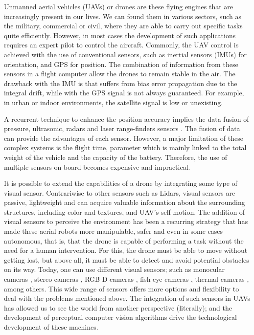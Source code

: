 Unmanned aerial vehicles (UAVs) or drones are these flying engines that are increasingly present in our lives. We can found them in various sectors, such as the military, commercial or civil, where they are able to carry out specific tasks quite efficiently. However, in most cases the development of such applications requires an expert pilot to control the aircraft. Commonly, the UAV  control is achieved with the use of conventional sensors, such as inertial sensors (IMUs) for orientation, and GPS for position. The combination of information from these sensors in a flight computer allow the drones to remain stable in the air. The drawback with the IMU is that suffers from bias error propagation due to the integral drift, while with the GPS signal is not always guaranteed. For example, in urban or indoor environments, the satellite signal is low or unexisting. 

A recurrent technique to enhance the position accuracy implies the data fusion of pressure, ultrasonic, radars and laser range-finders sensors \citep{Tomic.Schmid.ea:IRAM:2012}. The fusion of data can provide the advantages of each sensor. However, a major limitation of these complex systems is the flight time, parameter which is mainly linked to the total weight of the vehicle and the capacity of the battery. Therefore, the use of multiple sensors on board becomes expensive and impractical.

It is possible to extend the capabilities of a drone by integrating some type of visual sensor. Contrariwise to other sensors such as Lidars, visual sensors are passive, lightweight and can acquire valuable information about the surrounding structures, including color and textures, and UAV's self-motion. The addition of visual sensors to perceive the environment has been a recurring strategy that has made these aerial robots more manipulable, safer and even in some cases autonomous, that is, that the drone is capable of performing a task without the need for a human intervention. For this, the drone must be able to move without getting lost, but above all, it must be able to detect and avoid potential obstacles on its way. 
Today, one can use different visual sensors; such as monocular cameras \citep{Padhy.Xia.ea:TSC:2018}, stereo cameras \citep{Seitz.Curless.ea:CVPR:2006}, RGB-D cameras \citep{Huang.Bachrach.ea:RobR:2017}, fish-eye cameras \citep{Hrabar.Sukhatme:IROS:2004}, thermal cameras \citep{Gaszczak.Breckon.ea:IRCV:2011}, among others. This wide range of sensors offers more options and flexibility to deal with the problems mentioned above. The integration of such sensors in UAVs has allowed us to see the world from another perspective (literally); and the development of perceptual computer vision algorithms drive the technological development of these machines.

